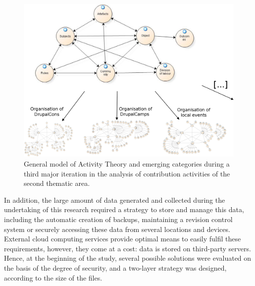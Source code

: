 \begin{figure}[H]
	\centering
	\includegraphics[scale=0.38]{./diagrams/models_merged_ta2.png}
	\caption[Emergent categories conceptualised through the general model of Activity Theory]{General model of Activity Theory and emerging categories during a third major iteration in the analysis of contribution activities of the second thematic area.}
	\label{model-merged}
\end{figure}

In addition, the large amount of data generated and collected during the undertaking of this research required a strategy to store and manage this data, including the automatic creation of backups, maintaining a revision control system or securely accessing these data from several locations and devices. External cloud computing services provide optimal means to easily fulfil these requirements, however, they come at a cost: data is stored on third-party servers. Hence, at the beginning of the study, several possible solutions were evaluated on the basis of the degree of security, and a two-layer strategy was designed, according to the size of the files.

